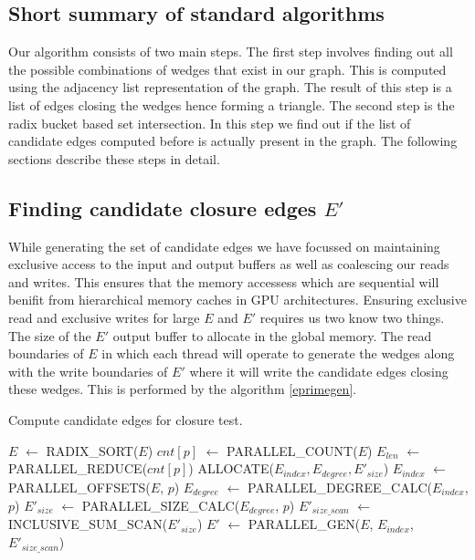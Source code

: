 \documentclass[conference]{IEEEtran}
\begin{document}
\subsection{Short summary of standard algorithms}
Our algorithm consists of two main steps. The first step involves finding out all the possible combinations of wedges that exist in our graph. This is computed using the adjacency list representation of the graph. The result of this step is a list of edges closing the wedges hence forming a triangle. The second step is the radix bucket based set intersection. In this step we find out if the list of candidate edges computed before is actually present in the graph. The following sections describe these steps in detail.

\subsection{Finding candidate closure edges $E'$}
While generating the set of candidate edges we have focussed on maintaining exclusive access to the input and output buffers as well as coalescing our reads and writes. This ensures that the memory accessess which are sequential  will benifit from hierarchical memory caches in GPU architectures. Ensuring exclusive read and exclusive writes for large $E$ and $E'$ requires us two know two things. The size of the $E'$ output buffer to allocate in the global memory. The read boundaries of $E$ in which each thread will operate to generate the wedges along with the write boundaries of $E'$ where it will write the candidate edges closing these wedges. This is performed by the algorithm \ref{eprimegen}.

\begin{algorithm}
  \caption{Compute candidate edges for closure test.\label{eprimegen}}  
  \begin{algorithmic}[1]
    \Statex
      \State $E$ $\gets$ RADIX\_SORT($E$)  \label{cubs_radix_sort}
      \State $cnt[p]$ $\gets$ PARALLEL\_COUNT($E$)  \label{par_cnt}
      \State $E_{len}$ $\gets$ PARALLEL\_REDUCE($cnt[p]$) \label{par_red}
      \State ALLOCATE($E_{index}, E_{degree}, E'_{size}$) 
      \State $E_{index}$ $\gets$ PARALLEL\_OFFSETS($E$, $p$) \label{par_offset}
      \State $E_{degree}$ $\gets$ PARALLEL\_DEGREE\_CALC($E_{index}$, $p$) \label{par_deg_calc}
      \State $E'_{size}$ $\gets$ PARALLEL\_SIZE\_CALC($E_{degree}$, $p$) \label{par_size_calc}
      \State $E'_{size\_scan}$ $\gets$ INCLUSIVE\_SUM\_SCAN($E'_{size}$)
      \State $E'$ $\gets$ PARALLEL\_GEN($E$, $E_{index}$, $E'_{size\_scan}$) \label{par_gen}
      \State {}
    \EndFunction
  \end{algorithmic}
\end{algorithm}
\end{document}
